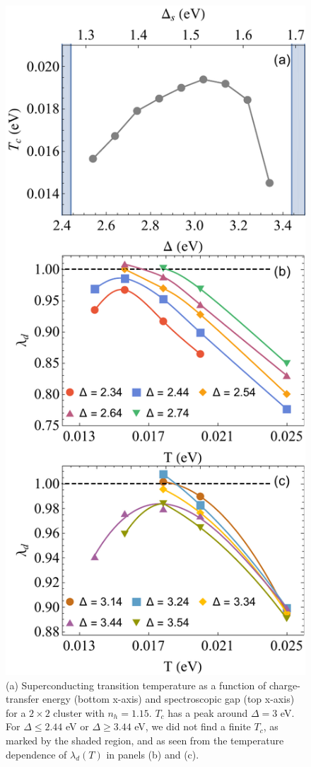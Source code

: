\documentclass[reprint,nofootinbib,nobibnotes,amsmath,amssymb,aps,prb,floatfix]{revtex4-2}
\begin{document}
\begin{figure}[ht]
\includegraphics[width=0.88\linewidth]{2by2TcvaryCTE.pdf}
\caption{(a) Superconducting transition temperature as a function of charge-transfer energy (bottom x-axis) and spectroscopic gap (top x-axis) for a $2\times2$ cluster with $n_h=1.15$. $T_c$ has a peak around $\Delta=3$ eV. For $\Delta \le 2.44$ eV or $\Delta \ge 3.44$ eV, we did not find a finite $T_c$, as marked by the shaded region, and as seen from the temperature dependence of $\lambda_d(T)$ in panels (b) and (c).
}
\label{vsdelta}
\end{figure}
\end{document}
